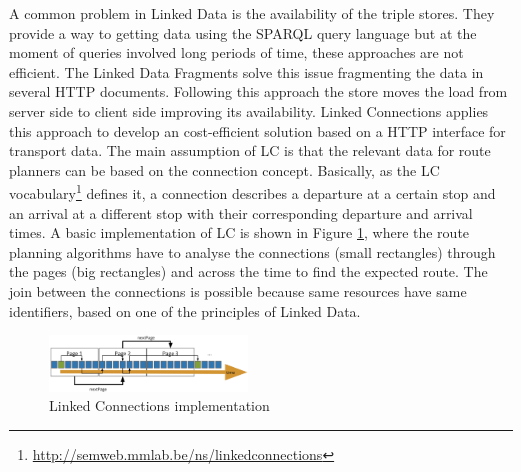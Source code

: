 \documentclass[sw]{iosart2x}
\begin{document}
A common problem in Linked Data is the availability of the triple stores. They provide a way to getting data using the SPARQL query language but at the moment of queries involved long periods of time, these approaches are not efficient\cite{verborgh2014querying}. The Linked Data Fragments\cite{verborgh2016triple,verborgh2014web} solve this issue fragmenting the data in several HTTP documents. Following this approach the store moves the load from server side to client side improving its availability. Linked Connections\cite{colpaert2015intermodal} applies this approach to develop an cost-efficient solution based on a HTTP interface for transport data. The main assumption of LC  is that the relevant data for route planners can be based on the connection concept. Basically, as the LC vocabulary\footnote{\url{http://semweb.mmlab.be/ns/linkedconnections}} defines it, a connection describes a departure at a certain stop and an arrival at a different stop with their corresponding departure and arrival times. A basic implementation of LC is shown in Figure \ref{fig:lc_imp}, where the route planning algorithms have to analyse the connections (small rectangles) through the pages (big rectangles) and across the time to find the expected route. The join between the connections is possible because same resources have same identifiers, based on one of the principles of Linked Data.


\begin{figure}[t]
	\includegraphics[width=0.47\textwidth]{images/implementation.png}
	\caption{Linked Connections implementation}\label{fig:lc_imp}
\end{figure}
\end{document}
